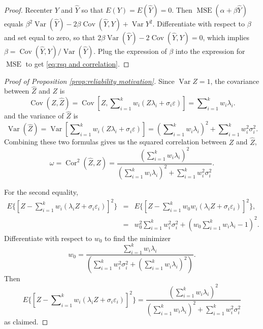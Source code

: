 \documentclass[twoside]{article}
\DeclareMathOperator{\Var}{Var}
\DeclareMathOperator{\Cor}{Cor}
\DeclareMathOperator{\Cov}{Cov}
\DeclareMathOperator{\MSE}{MSE}
\DeclareMathOperator{\tsum}{\textstyle \sum}
\begin{document}
\begin{proof}
Recenter $Y$ and $\hat{Y}$ so that $E(Y)=E(\hat{Y})=0$. Then $\MSE(\alpha+\beta\hat{Y})$ equals $\beta^{2}\Var(\hat{Y})-2\beta\Cov(\hat{Y},Y)+\Var Y^{2}$.
Differentiate with respect to $\beta$ and set equal to zero, so that
$2\beta\Var(\hat{Y})-2\Cov(\hat{Y},Y)=0$, which implies $\beta=\Cov(\hat{Y},Y)/\Var(\hat{Y})$. Plug the expression of $\beta$ into the expression for $\MSE$ to get \cref{eq:rsq and correlation}.
\end{proof}

\begin{proof}[Proof of Proposition \ref{prop:reliability motivation}]\label{proof:reliability motivation}
Since $\Var Z=1$, the covariance between $\hat{Z}$ and $Z$
is
\begin{equation}
\Cov(Z,\hat{Z})=\Cov[Z,{\textstyle\tsum_{i=1}^{k}w_{i}}(Z\lambda_{i}+\sigma_{i}\varepsilon)]  =  {\textstyle\tsum_{i=1}^{k}w_{i}}\lambda_{i}.
\end{equation}
and the variance of $\hat{Z}$ is
\[
\Var(\hat{Z})=\Var[{\textstyle\tsum_{i=1}^{k}}w_{i}(Z\lambda_{i}+\sigma_{i}\varepsilon)]
=({\textstyle\tsum_{i=1}^{k}}w_{i}\lambda_{i})^{2}+\tsum_{i=1}^{k}w_{i}^{2}\sigma_{i}^{2}.
\]
Combining these two formulas gives us the squared correlation between
$Z$ and $\hat{Z}$,
\begin{equation}
\omega=\Cor^{2}(\hat{Z},Z) = \frac{(\tsum_{i=1}^{k}w_{i}\lambda_{i})^{2}}{(\tsum_{i=1}^{k}w_{i}\lambda_{i})^{2}+\tsum_{i=1}^{k}w_{i}^{2}\sigma_{i}^{2}}.
\end{equation}

For the second equality,
\begin{eqnarray*}
E\{ [Z-\tsum_{i=1}^{k}w_{i}(\lambda_{i}Z+\sigma_{i}\varepsilon_{i})]^{2}\}  & = & E\{ [Z-\tsum_{i=1}^{k}w_{0}w_{i}(\lambda_{i}Z+\sigma_{i}\varepsilon_{i})]^{2}\} ,\\
 & = & w_{0}^{2}\tsum_{i=1}^{k}w_{i}^{2}\sigma_{i}^{2}+(w_{0}\tsum_{i=1}^{k}w_{i}\lambda_{i}-1)^{2}.
\end{eqnarray*}
Differentiate with respect to $w_{0}$ to find the minimizer
\[
w_{0}=\frac{\tsum_{i=1}^{k}w_{i}\lambda_{i}}{(\tsum_{i=1}^{k}w_{i}^{2}\sigma_{i}^{2}+(\tsum_{i=1}^{k}w_{i}\lambda_{i})^{2})}.
\]
Then
\[
E\{[Z-\tsum_{i=1}^{k}w_{i}(\lambda_{i}Z+\sigma_{i}\varepsilon_{i})]^{2}\} =\frac{(\tsum_{i=1}^{k}w_{i}\lambda_{i})^{2}}{(\tsum_{i=1}^{k}w_{i}\lambda_{i})^{2}+\tsum_{i=1}^{k}w_{i}^{2}\sigma_{i}^{2}}
\]
as claimed.
\end{proof}
\end{document}
